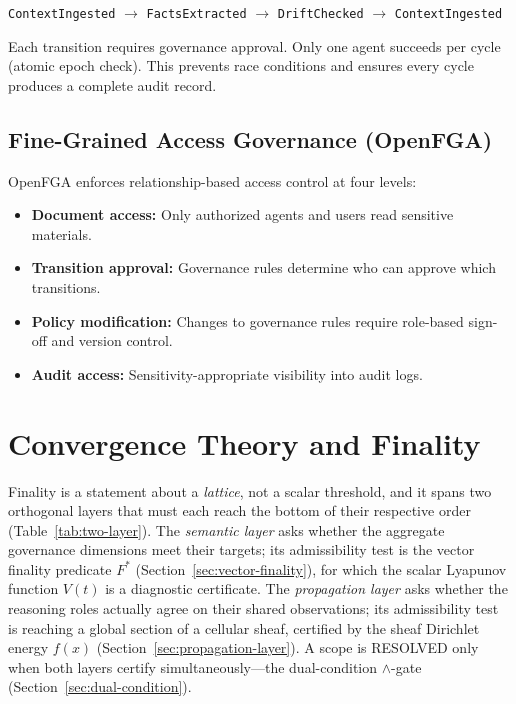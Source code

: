 \documentclass[11pt]{article}
\begin{document}
\begin{center}
\texttt{ContextIngested} $\rightarrow$ \texttt{FactsExtracted} $\rightarrow$ \texttt{DriftChecked} $\rightarrow$ \texttt{ContextIngested}
\end{center}

Each transition requires governance approval. Only one agent succeeds per cycle (atomic epoch check). This prevents race conditions and ensures every cycle produces a complete audit record.

\subsection{Fine-Grained Access Governance (OpenFGA)}
\label{sec:openfga}

OpenFGA \cite{pang2019} enforces relationship-based access control at four levels:

\begin{itemize}
  \item \textbf{Document access:} Only authorized agents and users read sensitive materials.
  \item \textbf{Transition approval:} Governance rules determine who can approve which transitions.
  \item \textbf{Policy modification:} Changes to governance rules require role-based sign-off and version control.
  \item \textbf{Audit access:} Sensitivity-appropriate visibility into audit logs.
\end{itemize}

\section{Convergence Theory and Finality}

Finality is a statement about a \emph{lattice}, not a scalar threshold, and it spans two orthogonal layers that must each reach the bottom of their respective order (Table~\ref{tab:two-layer}). The \emph{semantic layer} asks whether the aggregate governance dimensions meet their targets; its admissibility test is the vector finality predicate $F^*$ (Section~\ref{sec:vector-finality}), for which the scalar Lyapunov function $V(t)$ is a diagnostic certificate. The \emph{propagation layer} asks whether the reasoning roles actually agree on their shared observations; its admissibility test is reaching a global section of a cellular sheaf, certified by the sheaf Dirichlet energy $f(x)$ (Section~\ref{sec:propagation-layer}). A scope is RESOLVED only when both layers certify simultaneously---the dual-condition $\wedge$-gate (Section~\ref{sec:dual-condition}).
\end{document}
